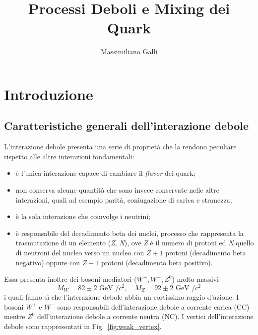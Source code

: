 \documentclass{subnucbo}
\title{Processi Deboli e Mixing dei Quark}
\author{Massimiliano Galli}
\begin{document}
\maketitle

\begin{abstract}
\end{abstract}

\section{Introduzione}
\subsection{Caratteristiche generali dell'interazione debole}
L'interazione debole presenta una serie di proprietà che la rendono peculiare rispetto alle altre interazioni fondamentali:
\begin{itemize}
        \item è l'unica interazione capace di cambiare il \textit{flavor} dei quark;
        \item non conserva alcune quantità che sono invece conservate nelle altre interazioni, quali ad esempio parità, coniugazione di carica e stranezza;
        \item è la sola interazione che coinvolge i neutrini;
        \item è responsabile del decadimento beta dei nuclei, processo che rappresenta la trasmutazione di un elemento (\textit{Z}, \textit{N}), ove \textit{Z} è il numero di protoni ed \textit{N} quello di neutroni del nucleo verso un nucleo con $\textit{Z} + 1$ protoni (decadimento beta negativo) oppure con $\textit{Z} - 1$ protoni (decadimento beta positivo).
\end{itemize}
Essa presenta inoltre dei bosoni mediatori ($W^{+}, W^{-}, Z^{0}$) molto massivi
\begin{equation}
        M _ { W } = 82 \pm 2 \text { GeV } / c ^ { 2 } , \quad M _ { Z } = 92 \pm 2 \text { GeV } / c ^ { 2 }
        \label{eq:bosons_masses}
\end{equation}
i quali fanno sì che l'interazione debole abbia un cortissimo raggio d'azione. I bosoni $W^{+}$ e $W^{-}$ sono responsabili dell'interazione debole a corrente carica (CC) mentre $Z^{0}$ dell'interazione debole a corrente neutra (NC). I vertici dell'interazione debole sono rappresentati in Fig.~\ref{fig:weak_vertex}.
\end{document}
